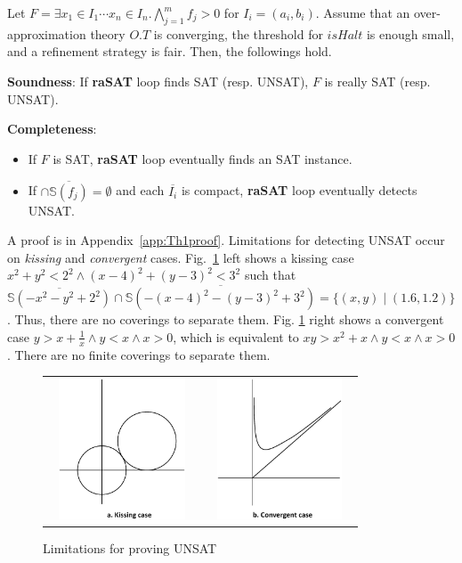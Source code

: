\documentclass[runningheads,a4paper,oribibl]{llncs}
\begin{document}
\begin{theorem} \label{th:RelComp}
Let
$F = \exists x_1 \in I_1 \cdots x_n \in I_n. \bigwedge \limits_{j=1}^m f_j > 0$
for $I_i = (a_i,b_i)$.
Assume that an over-approximation theory $O.T$ is converging, 
the threshold for $isHalt$ is enough small, and a refinement strategy is fair. 
Then, the followings hold. 

\medskip
\noindent 
\textbf{Soundness}: If {\bf raSAT} loop finds SAT (resp. UNSAT), 
$F$ is really SAT (resp. UNSAT).

\medskip
\noindent 
\textbf{Completeness}: 
\begin{itemize}
\item If $F$ is SAT, {\bf raSAT} loop eventually finds an SAT instance. 
\item If $\cap \overline{\mathbb{S}(f_j)} = \emptyset$ and each $\overline{I_i}$ is compact, 
{\bf raSAT} loop eventually detects UNSAT.
\end{itemize}
\end{theorem}

A proof is in Appendix~\ref{app:Th1proof}. 
Limitations for detecting UNSAT occur on \emph{kissing} and \emph{convergent} cases. 
Fig.~\ref{fig:limit} left shows a kissing case 
$x^2 + y^2 < 2^2 \wedge (x-4)^2 + (y-3)^2 < 3^2$ such that 
$\overline{\mathbb{S}(- x^2 - y^2 + 2^2)} \cap \overline{\mathbb{S}(- (x-4)^2 - (y-3)^2 + 3^2)} 
= \{(x,y) \mid (1.6, 1.2)\}$. 
Thus, there are no coverings to separate them. 
%
Fig. \ref{fig:limit} right shows a convergent case 
$y > x + \frac{1}{x} \wedge y < x \wedge x > 0$, which is equivalent to 
$xy > x^2 + x \wedge y < x \wedge x > 0$. 
There are no finite coverings to separate them. 

\begin{figure}[ht]
\centering
\begin{tabular}{cc}
\includegraphics[height=1.65in,width=1.7in]{kissing.eps} &
\includegraphics[height=1.65in,width=1.7in]{convergence.eps}
\end{tabular}
\caption{Limitations for proving UNSAT} 
\label{fig:limit} 
\end{figure} 
\end{document}

